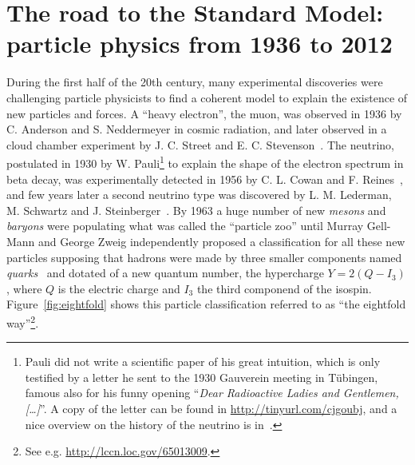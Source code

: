 
\section{The road to the Standard Model: particle physics from 1936 to 2012}\label{sec:THsm}

During the first half of the 20th century, many experimental 
discoveries were challenging particle physicists to find a 
coherent model to explain the existence of new particles and 
forces. A ``heavy electron'', the muon, was observed in 1936 
by C. %
 Anderson and S. %
 Neddermeyer in cosmic radiation, and later
observed in a cloud chamber experiment by %
J. C. Street and E. C. Stevenson~\cite{PhysRev.52.1003}. 
The neutrino, postulated in 1930 by %
W. Pauli\footnote{Pauli did not write a scientific
paper of his great intuition, which is only testified 
by a letter he sent to the 1930 Gauverein meeting in T\"ubingen,
famous also for his funny opening 
``{\it Dear Radioactive Ladies and Gentlemen,[\dots]}''. A copy
of the letter can be found in \url{http://tinyurl.com/cjgoubj}, 
and a nice overview on the history of the neutrino is in~\cite{2006physics...3106P}.}
to explain the shape of the electron 
spectrum in beta decay, was experimentally 
detected in 1956 by %
C. L. Cowan and %
F. Reines~\cite{1956Sci...124..103C}, and few years later a 
second neutrino type was discovered by %
L. M. Lederman, %
M. Schwartz and %
J. Steinberger~\cite{1962PhRvL...9...36D}. 
By 1963 a huge number of new {\it mesons} and {\it baryons} 
were populating what was called the ``particle zoo'' 
until Murray Gell-Mann and George Zweig independently proposed 
a classification for all these new particles 
supposing that hadrons were made by three smaller 
components named {\it quarks}~\cite{GellMann1964214,Zweig:352337}
and dotated of a new
quantum number, the hypercharge $Y=2(Q-I_3)$, where $Q$ is the electric
charge and $I_3$ the third componend of the isospin.
Figure~\ref{fig:eightfold} shows this particle classification referred to as 
``the eightfold way''\footnote{See e.g. \url{http://lccn.loc.gov/65013009}.}. 

